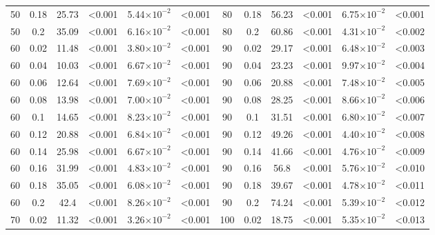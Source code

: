 \documentclass[12pt]{article}
\begin{document}
\begin{spacing}{2.0}
\begin{table}[h!]
\begin{tabular}{c c | c c| c c ||c c | c c | c c |}
            50  & 0.18  & 25.73 & \textless0.001  & 5.44$\times10^{-2}$ & \textless0.001  & 80  & 0.18  & 56.23 & \textless0.001  & 6.75$\times10^{-2}$ & \textless0.001  \\
            50  & 0.2 & 35.09 & \textless0.001  & 6.16$\times10^{-2}$ & \textless0.001  & 80  & 0.2 & 60.86 & \textless0.001  & 4.31$\times10^{-2}$ & \textless0.002  \\
            60  & 0.02  & 11.48 & \textless0.001  & 3.80$\times10^{-2}$ & \textless0.001  & 90  & 0.02  & 29.17 & \textless0.001  & 6.48$\times10^{-2}$ & \textless0.003  \\
            60  & 0.04  & 10.03 & \textless0.001  & 6.67$\times10^{-2}$ & \textless0.001  & 90  & 0.04  & 23.23 & \textless0.001  & 9.97$\times10^{-2}$ & \textless0.004  \\
            60  & 0.06  & 12.64 & \textless0.001  & 7.69$\times10^{-2}$ & \textless0.001  & 90  & 0.06  & 20.88 & \textless0.001  & 7.48$\times10^{-2}$ & \textless0.005  \\
            60  & 0.08  & 13.98 & \textless0.001  & 7.00$\times10^{-2}$ & \textless0.001  & 90  & 0.08  & 28.25 & \textless0.001  & 8.66$\times10^{-2}$ & \textless0.006  \\
            60  & 0.1 & 14.65 & \textless0.001  & 8.23$\times10^{-2}$ & \textless0.001  & 90  & 0.1 & 31.51 & \textless0.001  & 6.80$\times10^{-2}$ & \textless0.007  \\
            60  & 0.12  & 20.88 & \textless0.001  & 6.84$\times10^{-2}$ & \textless0.001  & 90  & 0.12  & 49.26 & \textless0.001  & 4.40$\times10^{-2}$ & \textless0.008  \\
            60  & 0.14  & 25.98 & \textless0.001  & 6.67$\times10^{-2}$ & \textless0.001  & 90  & 0.14  & 41.66 & \textless0.001  & 4.76$\times10^{-2}$ & \textless0.009  \\
            60  & 0.16  & 31.99 & \textless0.001  & 4.83$\times10^{-2}$ & \textless0.001  & 90  & 0.16  & 56.8  & \textless0.001  & 5.76$\times10^{-2}$ & \textless0.010  \\
            60  & 0.18  & 35.05 & \textless0.001  & 6.08$\times10^{-2}$ & \textless0.001  & 90  & 0.18  & 39.67 & \textless0.001  & 4.78$\times10^{-2}$ & \textless0.011  \\
            60  & 0.2 & 42.4  & \textless0.001  & 8.26$\times10^{-2}$ & \textless0.001  & 90  & 0.2 & 74.24 & \textless0.001  & 5.39$\times10^{-2}$ & \textless0.012  \\
            70  & 0.02  & 11.32 & \textless0.001  & 3.26$\times10^{-2}$ & \textless0.001  & 100 & 0.02  & 18.75 & \textless0.001  & 5.35$\times10^{-2}$ & \textless0.013  \\

\end{tabular}
\end{table}
\end{spacing}
\end{document}
